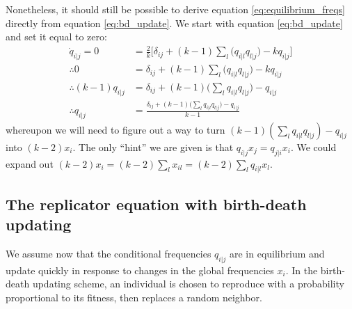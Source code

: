 \documentclass[14pt, justified]{tufte-handout}
\begin{document}
Nonetheless, it should still be possible to derive equation \ref{eq:equilibrium_freqs} directly from equation \ref{eq:bd_update}.
We start with equation \ref{eq:bd_update} and set it equal to zero:
\begin{equation}
    \begin{split}
        \dot{q}_{i|j} = 0 & = \frac{2}{k} \Big[ \delta_{ij} + (k-1)\sum_l \Big( q_{i|l}q_{l|j} \Big) - kq_{i|j} \Big]
        \\
        \therefore 0 & = \delta_{ij} + (k-1)\sum_l \Big( q_{i|l}q_{l|j} \Big) - kq_{i|j}
        \\
        \therefore (k-1)q_{i|j} & = \delta_{ij} + (k-1)\Big( \sum_l q_{i|l}q_{l|j} \Big) - q_{i|j}
        \\
        \therefore q_{i|j} & = \frac{\delta_{ij} + (k-1)\Big( \sum_l q_{i|l}q_{l|j} \Big) - q_{i|j}}{k-1}
    \end{split}
\end{equation}
whereupon we will need to figure out a way to turn $(k-1)(\sum_l q_{i|l}q_{l|j}) - q_{i|j}$ into $(k-2)x_i$.
The only ``hint'' we are given is that $q_{i|j}x_j = q_{j|i}x_i$.
We could expand out $(k-2)x_i = (k-2)\sum_l x_{il} = (k-2)\sum_l q_{i|l} x_l$.

\subsection{The replicator equation with birth-death updating}

We assume now that the conditional frequencies $q_{i|j}$ are in equilibrium and update quickly in response to changes in the global frequencies $x_i$.
In the birth-death updating scheme, an individual is chosen to reproduce with a probability proportional to its fitness, then replaces a random neighbor.
\end{document}
